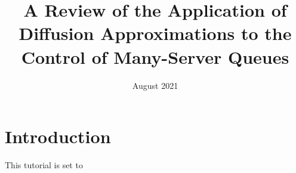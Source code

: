 \documentclass{article}
\title{A Review of the Application of Diffusion Approximations to the Control of Many-Server Queues}
\author{}
\date{August 2021}
\begin{document}
\maketitle

\section{Introduction}
This tutorial is set to 
\end{document}

